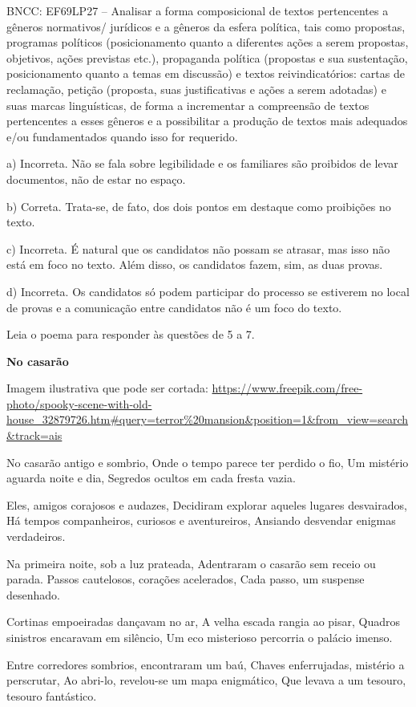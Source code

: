 \begin{itemize}
\begin{itemize}
{\begin{itemize}
\begin{itemize}
\begin{escolha}
\begin{escolha}
\begin{escolha}
\begin{escolha}
\begin{escolha}
BNCC: EF69LP27 -- Analisar a forma composicional de textos pertencentes
a gêneros normativos/ jurídicos e a gêneros da esfera política, tais
como propostas, programas políticos (posicionamento quanto a diferentes
ações a serem propostas, objetivos, ações previstas etc.), propaganda
política (propostas e sua sustentação, posicionamento quanto a temas em
discussão) e textos reivindicatórios: cartas de reclamação, petição
(proposta, suas justificativas e ações a serem adotadas) e suas marcas
linguísticas, de forma a incrementar a compreensão de textos
pertencentes a esses gêneros e a possibilitar a produção de textos mais
adequados e/ou fundamentados quando isso for requerido.

a) Incorreta. Não se fala sobre legibilidade e os familiares são
proibidos de levar documentos, não de estar no espaço.

b) Correta. Trata-se, de fato, dos dois pontos em destaque como
proibições no texto.

c) Incorreta. É natural que os candidatos não possam se atrasar, mas
isso não está em foco no texto. Além disso, os candidatos fazem, sim, as
duas provas.

d) Incorreta. Os candidatos só podem participar do processo se estiverem
no local de provas e a comunicação entre candidatos não é um foco do
texto.

Leia o poema para responder às questões de 5 a 7.

\textbf{No casarão}

Imagem ilustrativa que pode ser cortada:
\url{https://www.freepik.com/free-photo/spooky-scene-with-old-house_32879726.htm\#query=terror\%20mansion\&position=1\&from_view=search\&track=ais}

No casarão antigo e sombrio, Onde o tempo parece ter perdido o fio, Um
mistério aguarda noite e dia, Segredos ocultos em cada fresta vazia.

Eles, amigos corajosos e audazes, Decidiram explorar aqueles lugares
desvairados, Há tempos companheiros, curiosos e aventureiros, Ansiando
desvendar enigmas verdadeiros.

Na primeira noite, sob a luz prateada, Adentraram o casarão sem receio
ou parada. Passos cautelosos, corações acelerados, Cada passo, um
suspense desenhado.

Cortinas empoeiradas dançavam no ar, A velha escada rangia ao pisar,
Quadros sinistros encaravam em silêncio, Um eco misterioso percorria o
palácio imenso.

Entre corredores sombrios, encontraram um baú, Chaves enferrujadas,
mistério a perscrutar, Ao abri-lo, revelou-se um mapa enigmático, Que
levava a um tesouro, tesouro fantástico.


\end{escolha}
\end{escolha}
\end{escolha}
\end{escolha}
\end{escolha}
\end{itemize}
\end{itemize}}
\end{itemize}
\end{itemize}
